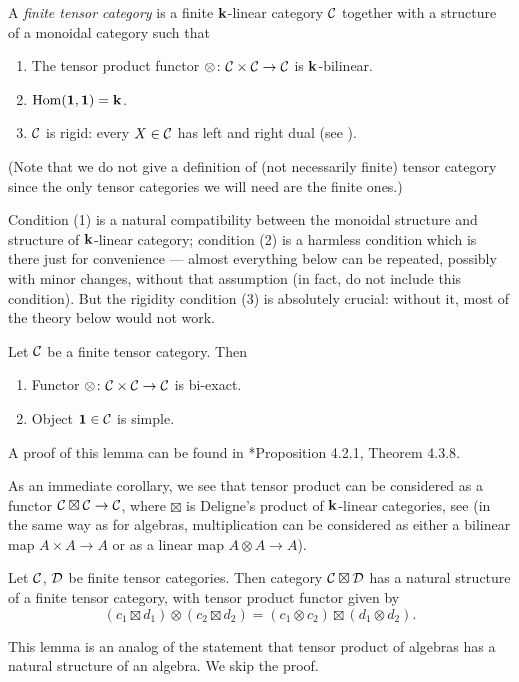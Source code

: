\begin{definition}\label{d:finite-tensor}
  A \emph{finite tensor category} is a finite $\mathbf{k}$-linear category $\mathcal{C}$
  together with a structure of a monoidal category such that
  \begin{enumerate}
    \item The tensor product functor $\otimes\colon
     \mathcal{C}\times \mathcal{C}\to \mathcal{C}$ is $\mathbf{k}$-bilinear.
    \item $\operatorname{Hom}(\mathbf{1}, \mathbf{1})=\mathbf{k}$.
    \item $\mathcal{C}$ is rigid: every $X\in \mathcal{C}$ has left and right dual (see
      ).
  \end{enumerate}
\end{definition}
(Note that we do not give a definition of (not necessarily finite) tensor
category since the only tensor categories we will need are the finite ones.)

Condition (1) is a natural compatibility between the monoidal structure and
structure of $\mathbf{k}$-linear category; condition (2) is a harmless condition which
is there just for convenience --- almost everything below can be repeated,
possibly with minor changes, without that assumption (in fact,
 do not include this condition). But the rigidity condition
(3) is absolutely crucial: without it, most of the theory below would not work.


\begin{lemma}\label{l:tensor-biexact}
  Let $\mathcal{C}$ be a finite tensor category. Then
  \begin{enumerate}
    \item Functor $\otimes \colon \mathcal{C}\times \mathcal{C}\to \mathcal{C}$ is bi-exact.
    \item Object $\mathbf{1}\in \mathcal{C}$ is simple.
  \end{enumerate}
\end{lemma}
A proof of this lemma can be found in *{Proposition
4.2.1, Theorem 4.3.8}.

As an immediate corollary, we see that tensor product can be considered as a
functor $\mathcal{C}\boxtimes \mathcal{C}\to \mathcal{C}$, where $\boxtimes$ is Deligne's product
of $\mathbf{k}$-linear categories, see  (in the same way as
for algebras, multiplication can be considered as either a bilinear map $A\times
A\to A$ or as a linear map $A\otimes A\to A$).

\begin{lemma}\label{l:tensor-boxtimes}
  Let $\mathcal{C}$, $\mathcal{D}$ be finite tensor categories. Then category
  $\mathcal{C}\boxtimes \mathcal{D}$ has a natural structure of a finite tensor category,
  with tensor product functor given by
  $$
  (c_1 \boxtimes d_1)\otimes (c_2\boxtimes d_2)
    = (c_1\otimes c_2)\boxtimes (d_1\otimes d_2).
  $$
\end{lemma}
This lemma is an analog of the statement that tensor product of algebras has a
natural structure of an algebra. We skip the proof.

